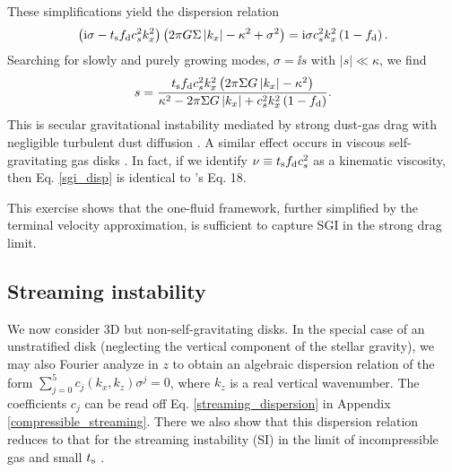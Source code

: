 These simplifications yield the dispersion relation
\begin{align*}
  \left(\mathrm{i}\sigma - t_\mathrm{s}f_\mathrm{d} c_s^2k_x^2\right)\left( 2 \pi G
    \Sigma \left|k_x\right|  - \kappa^2 + \sigma^2 \right) = \mathrm{i}
  \sigma c_s^2 k_x^2\left(1 - f_\mathrm{d}\right). 
\end{align*}
Searching for slowly and purely growing modes, $\sigma = \ii s$ with 
$|s|\ll \kappa$, we find 
\begin{align}  
s = \frac{t_\mathrm{s}f_\mathrm{d} c_s^2 k_x^2 \left( 2 \pi \Sigma G
    \left|k_x\right| - \kappa^2\right)}{\kappa^2 -2 \pi \Sigma G
    \left|k_x\right| + c_s^2k_x^2\left(1-f_\mathrm{d}\right) }. \label{sgi_disp}
\end{align}
This is secular gravitational instability mediated by strong
dust-gas drag with negligible turbulent dust diffusion 
\citep[][ their Eq. 13 becomes our Eq. \ref{sgi_disp} in this limit
after 
a change of variables]{takahashi14}. A similar effect occurs in viscous
self-gravitating gas disks \citep{gammie96,lin16}. In fact, if we
identify $\nu \equiv t_\mathrm{s} f_\mathrm{d} c_s^2$ as a kinematic viscosity,
then Eq. \ref{sgi_disp} is identical to \citeauthor{gammie96}'s Eq. 18. 

This exercise shows that the one-fluid framework, further simplified by
the terminal velocity approximation, is sufficient to capture SGI
in the strong drag limit. 

\subsection{Streaming instability}\label{si}
We now consider 3D but non-self-gravitating disks.  
In the special case of an unstratified disk (neglecting the vertical
component of the stellar gravity), we may also Fourier analyze in $z$
to obtain an algebraic dispersion relation of the form  
$\sum_{j=0}^{5}c_j(k_x,k_z)\sigma^j = 0$, where $k_z$ is a real
vertical wavenumber. The coefficients $c_j$ can be read 
off Eq. \ref{streaming_dispersion} in  Appendix \ref{compressible_streaming}. 
There we also show that this dispersion relation reduces to that for
the streaming instability (SI) in the limit of incompressible gas and small
$t_\mathrm{s}$ \citep{youdin05a,jacquet11}.   
 


